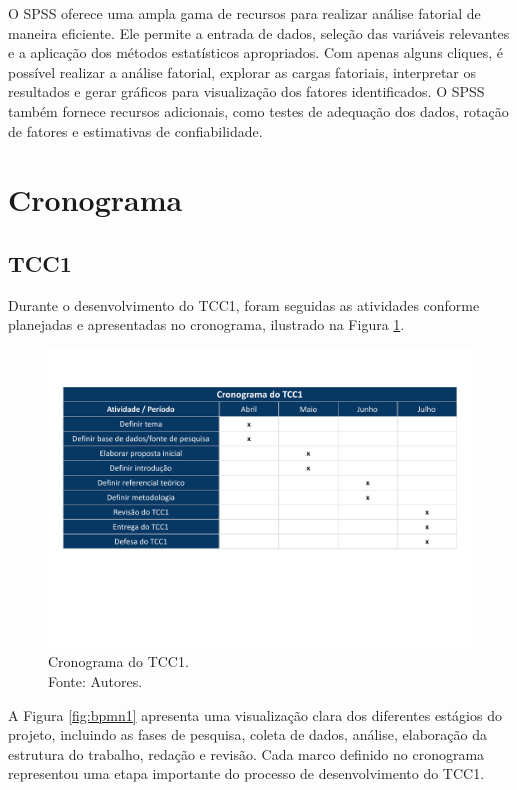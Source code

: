 O SPSS oferece uma ampla gama de recursos para realizar análise fatorial de maneira eficiente. Ele permite a entrada de dados, seleção das variáveis relevantes e a aplicação dos métodos estatísticos apropriados. Com apenas alguns cliques, é possível realizar a análise fatorial, explorar as cargas fatoriais, interpretar os resultados e gerar gráficos para visualização dos fatores identificados. O SPSS também fornece recursos adicionais, como testes de adequação dos dados, rotação de fatores e estimativas de confiabilidade.

\section{Cronograma}

\subsection{TCC1}

Durante o desenvolvimento do TCC1, foram seguidas as atividades conforme planejadas e apresentadas no cronograma, ilustrado na Figura \ref{fig:cronograma_tcc1}.

\begin{figure}[H]
    \centering
    \includegraphics[width=1.0\textwidth]{figuras/cronograma_tcc1.pdf}
    \vspace{-110pt}
    \caption{Cronograma do TCC1.\\
    Fonte: Autores.}
    \label{fig:cronograma_tcc1}
\end{figure}


A Figura \ref{fig:bpmn1} apresenta uma visualização clara dos diferentes estágios do projeto, incluindo as fases de pesquisa, coleta de dados, análise, elaboração da estrutura do trabalho, redação e revisão. Cada marco definido no cronograma representou uma etapa importante do processo de desenvolvimento do TCC1.

